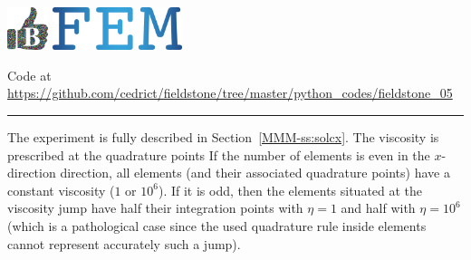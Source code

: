 \includegraphics[height=1.25cm]{images/pictograms/benchmark}
\includegraphics[height=1.25cm]{images/pictograms/FEM}





\begin{center}
Code at \url{https://github.com/cedrict/fieldstone/tree/master/python_codes/fieldstone_05}
\end{center}

\par\noindent\rule{\textwidth}{0.4pt}

The experiment is fully described in Section~\ref{MMM-ss:solcx}.
The viscosity is prescribed at the quadrature points 
If the number of elements is even in the $x$-direction direction, all elements 
(and their associated quadrature points)
have a constant viscosity ($1$ or  $10^6$). If it is odd, then the elements situated 
at the viscosity jump have half their integration points with $\eta=1$ and half 
with $\eta=10^6$ 
(which is a pathological case since the used quadrature rule inside elements cannot represent 
accurately such a jump).  

